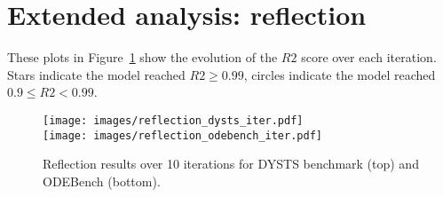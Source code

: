 \documentclass{article}
\begin{document}
\newpage

\section{Extended analysis: reflection}\label{app:reflection}

These plots in Figure~\ref{fig:reflection-iter} show the evolution of the $R2$ score over each iteration.
Stars indicate the model reached $R2\geq 0.99$, circles indicate the model reached $0.9\leq R2 < 0.99$.

\begin{figure}[H]
    \centering
    \texttt{[image: images/reflection\_dysts\_iter.pdf]}\\
    \texttt{[image: images/reflection\_odebench\_iter.pdf]}
    \caption{Reflection results over 10 iterations for DYSTS benchmark (top) and ODEBench (bottom).}
    \label{fig:reflection-iter}
\end{figure}
\end{document}
